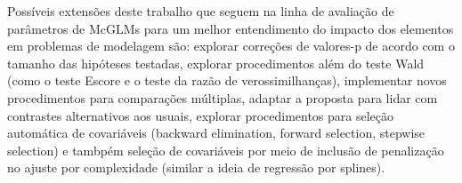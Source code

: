 Possíveis extensões deste trabalho que seguem na linha de avaliação de parâmetros de McGLMs para um melhor entendimento do impacto dos elementos em problemas de modelagem são: explorar correções de valores-p de acordo com o tamanho das hipóteses testadas, explorar procedimentos além do teste Wald (como o teste Escore e o teste da razão de verossimilhanças), implementar novos procedimentos para comparações múltiplas, adaptar a proposta para lidar com contrastes alternativos aos usuais, explorar procedimentos para seleção automática de covariáveis (backward elimination, forward selection, stepwise selection) e tambpém seleção de covariáveis por meio de inclusão de penalização no ajuste por complexidade (similar a ideia de regressão por splines).

